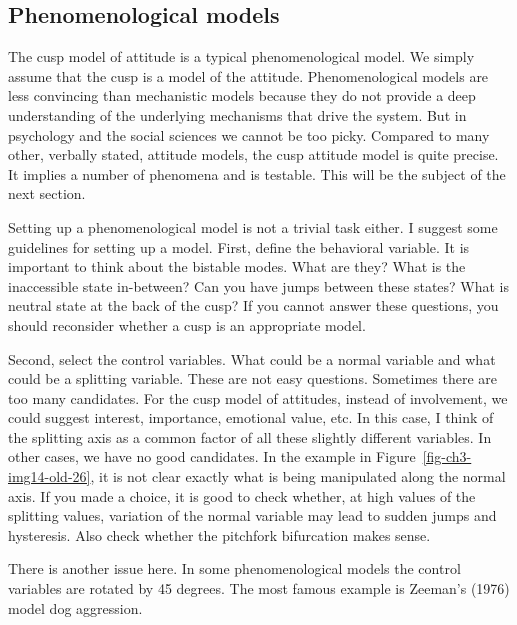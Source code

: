 \documentclass[
  a4paper,
  DIV=11,
  numbers=noendperiod,
  oneside]{scrreprt}
\begin{document}
\hypertarget{sec-Phenomenological-models}{%
\subsection{Phenomenological models}\label{sec-Phenomenological-models}}

The cusp model of attitude is a typical phenomenological model. We
simply assume that the cusp is a model of the attitude. Phenomenological
models are less convincing than mechanistic models because they do not
provide a deep understanding of the underlying mechanisms that drive the
system. But in psychology and the social sciences we cannot be too
picky. Compared to many other, verbally stated, attitude models, the
cusp attitude model is quite precise. It implies a number of phenomena
and is testable. This will be the subject of the next section.

Setting up a phenomenological model is not a trivial task either. I
suggest some guidelines for setting up a model. First, define the
behavioral variable. It is important to think about the bistable modes.
What are they? What is the inaccessible state in-between? Can you have
jumps between these states? What is neutral state at the back of the
cusp? If you cannot answer these questions, you should reconsider
whether a cusp is an appropriate model.

Second, select the control variables. What could be a normal variable
and what could be a splitting variable. These are not easy questions.
Sometimes there are too many candidates. For the cusp model of
attitudes, instead of involvement, we could suggest interest,
importance, emotional value, etc. In this case, I think of the splitting
axis as a common factor of all these slightly different variables. In
other cases, we have no good candidates. In the example in
Figure~\ref{fig-ch3-img14-old-26}, it is not clear exactly what is being
manipulated along the normal axis. If you made a choice, it is good to
check whether, at high values of the splitting values, variation of the
normal variable may lead to sudden jumps and hysteresis. Also check
whether the pitchfork bifurcation makes sense.

There is another issue here. In some phenomenological models the control
variables are rotated by 45 degrees. The most famous example is Zeeman's
(1976) model dog aggression.
\end{document}
